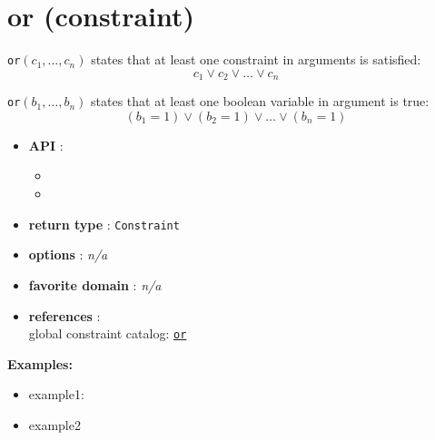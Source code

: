 \label{or}
\hypertarget{or}{}

\section{or (constraint)}\label{or:orconstraint}\hypertarget{or:orconstraint}{}
\begin{notedef}
  \texttt{or}$(c_1,\ldots,c_n)$ states that at least one constraint in arguments is satisfied:
$$ c_1 \lor c_2 \lor\ldots\lor c_n$$

  \texttt{or}$(b_1,\ldots,b_n)$ states that at least one boolean variable in argument is true:
$$ (b_1=1) \lor (b_2=1) \lor\ldots\lor (b_n=1)$$
\end{notedef}

\begin{itemize}
\item \textbf{API} : 
\begin{itemize}
\item {}
\item {}
\end{itemize}
	\item \textbf{return type} : \texttt{Constraint}
	\item \textbf{options} : \emph{n/a}
	\item \textbf{favorite domain} : \emph{n/a}
	\item \textbf{references} :\\
  global constraint catalog: \href{http://www.emn.fr/z-info/sdemasse/gccat/Cor.html}{\tt or}
\end{itemize}

\textbf{Examples:}
\begin{itemize}
	\item example1:
\end{itemize}

\begin{itemize}
	\item example2
\end{itemize}


